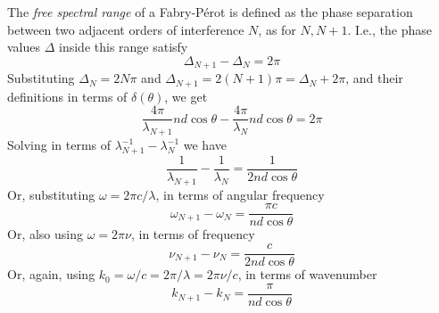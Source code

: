 \documentclass[../electromagnetism.tex]{subfiles}
\begin{document}
\begin{dfn}
	The \emph{free spectral range} of a Fabry-Pérot is defined as the phase separation between two adjacent orders of interference $N$, as for $N,N+1$. I.e., the phase values $\Delta$ inside this range satisfy
	\begin{equation}
		\Delta_{N+1}-\Delta_N=2\pi
		\label{eq:adjfreespectralrange}
	\end{equation}
	Substituting $\Delta_N=2N\pi$ and $\Delta_{N+1}=2(N+1)\pi=\Delta_N+2\pi$, and their definitions in terms of $\delta(\theta)$, we get 
	\begin{equation*}
		\frac{4\pi}{\lambda_{N+1}}nd\cos\theta-\frac{4\pi}{\lambda_N}nd\cos\theta=2\pi
	\end{equation*}
	Solving in terms of $\lambda_{N+1}^{-1}-\lambda_{N}^{-1}$ we have
	\begin{equation}
		\frac{1}{\lambda_{N+1}}-\frac{1}{\lambda_{N}}=\frac{1}{2nd\cos\theta}
		\label{eq:fsrlambda}
	\end{equation}
	Or, substituting $\omega=2\pi c/\lambda$, in terms of angular frequency
	\begin{equation}
		\omega_{N+1}-\omega_N=\frac{\pi c}{nd\cos\theta}
		\label{eq:fsromega}
	\end{equation}
	Or, also using $\omega=2\pi\nu$, in terms of frequency
	\begin{equation}
		\nu_{N+1}-\nu_N=\frac{c}{2nd\cos\theta}
		\label{eq:fsrnu}
	\end{equation}
	Or, again, using $k_0=\omega/c=2\pi/\lambda=2\pi\nu/c$, in terms of wavenumber
	\begin{equation}
		k_{N+1}-k_{N}=\frac{\pi}{nd\cos\theta}
		\label{eq:fsrk}
	\end{equation}
\end{dfn}
\end{document}
